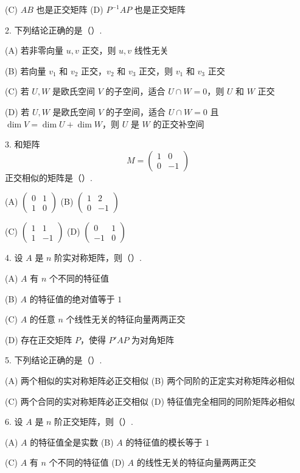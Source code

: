 \documentclass[UTF8,12pt,a4paper,fontset=fandol]{ctexart}
\begin{document}
(C) $AB$ 也是正交矩阵 \qquad (D) $P^{-1}AP$ 也是正交矩阵

2. 下列结论正确的是（\quad ）.

(A) 若非零向量 $u,v$ 正交，则 $u,v$ 线性无关

(B) 若向量 $v_1$ 和 $v_2$ 正交，$v_2$ 和 $v_3$ 正交，则 $v_1$ 和 $v_3$ 正交

(C) 若 $U,W$ 是欧氏空间 $V$ 的子空间，适合 $U\cap W=0$，则 $U$ 和 $W$ 正交

(D) 若 $U,W$ 是欧氏空间 $V$ 的子空间，适合 $U\cap W=0$ 且 $\dim V=\dim U+\dim W$，则 $U$ 是 $W$ 的正交补空间

3. 和矩阵
\[
M=\begin{pmatrix}
1&0\\
0&-1
\end{pmatrix}
\]
正交相似的矩阵是（\quad ）.

(A) $\begin{pmatrix}0&1\\1&0\end{pmatrix}$ \qquad
(B) $\begin{pmatrix}1&2\\0&-1\end{pmatrix}$

(C) $\begin{pmatrix}1&1\\1&-1\end{pmatrix}$ \qquad
(D) $\begin{pmatrix}0&1\\-1&0\end{pmatrix}$

4. 设 $A$ 是 $n$ 阶实对称矩阵，则（\quad ）.

(A) $A$ 有 $n$ 个不同的特征值

(B) $A$ 的特征值的绝对值等于 $1$

(C) $A$ 的任意 $n$ 个线性无关的特征向量两两正交

(D) 存在正交矩阵 $P$，使得 $P'AP$ 为对角矩阵

5. 下列结论正确的是（\quad ）.

(A) 两个相似的实对称矩阵必正交相似 \qquad
(B) 两个同阶的正定实对称矩阵必相似

(C) 两个合同的实对称矩阵必正交相似 \qquad
(D) 特征值完全相同的同阶矩阵必相似

6. 设 $A$ 是 $n$ 阶正交矩阵，则（\quad ）.

(A) $A$ 的特征值全是实数 \qquad
(B) $A$ 的特征值的模长等于 $1$

(C) $A$ 有 $n$ 个不同的特征值 \qquad
(D) $A$ 的线性无关的特征向量两两正交
\end{document}
